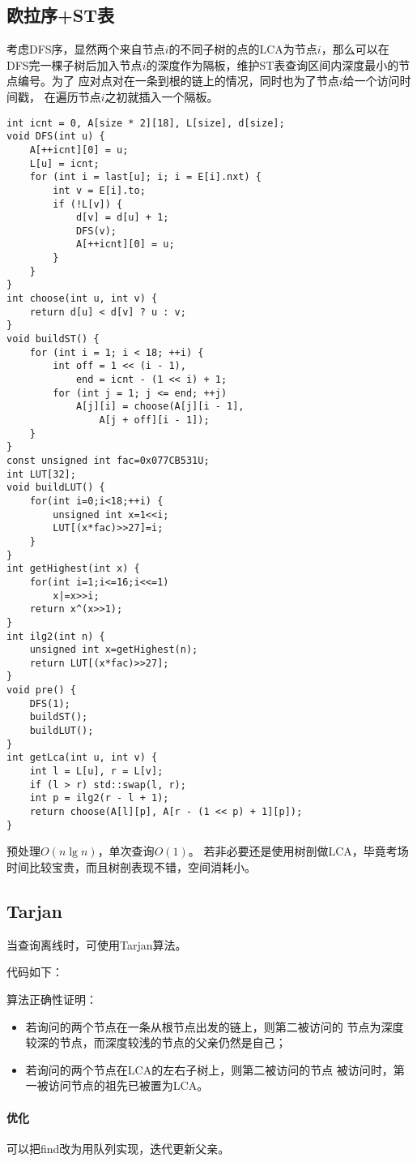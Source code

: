 \subsection{欧拉序+ST表}
考虑DFS序，显然两个来自节点$i$的不同子树的点的LCA为节点$i$，那么可以在
DFS完一棵子树后加入节点$i$的深度作为隔板，维护ST表查询区间内深度最小的节点编号。为了
应对点对在一条到根的链上的情况，同时也为了节点$i$给一个访问时间戳，
在遍历节点$i$之初就插入一个隔板。
\begin{lstlisting}
int icnt = 0, A[size * 2][18], L[size], d[size];
void DFS(int u) {
    A[++icnt][0] = u;
    L[u] = icnt;
    for (int i = last[u]; i; i = E[i].nxt) {
        int v = E[i].to;
        if (!L[v]) {
            d[v] = d[u] + 1;
            DFS(v);
            A[++icnt][0] = u;
        }
    }
}
int choose(int u, int v) {
    return d[u] < d[v] ? u : v;
}
void buildST() {
    for (int i = 1; i < 18; ++i) {
        int off = 1 << (i - 1),
            end = icnt - (1 << i) + 1;
        for (int j = 1; j <= end; ++j)
            A[j][i] = choose(A[j][i - 1],
                A[j + off][i - 1]);
    }
}
const unsigned int fac=0x077CB531U;
int LUT[32];
void buildLUT() {
    for(int i=0;i<18;++i) {
        unsigned int x=1<<i;
        LUT[(x*fac)>>27]=i;
    }
}
int getHighest(int x) {
    for(int i=1;i<=16;i<<=1)
        x|=x>>i;
    return x^(x>>1);
}
int ilg2(int n) {
    unsigned int x=getHighest(n);
    return LUT[(x*fac)>>27];
}
void pre() {
    DFS(1);
    buildST();
    buildLUT();
}
int getLca(int u, int v) {
    int l = L[u], r = L[v];
    if (l > r) std::swap(l, r);
    int p = ilg2(r - l + 1);
    return choose(A[l][p], A[r - (1 << p) + 1][p]);
}
\end{lstlisting}

预处理$O(n\lg n)$，单次查询$O(1)$。
若非必要还是使用树剖做LCA，毕竟考场时间比较宝贵，而且树剖表现不错，空间消耗小。
\subsection{Tarjan}
当查询离线时，可使用Tarjan算法。

代码如下：


算法正确性证明：
\begin{itemize}
    \item 若询问的两个节点在一条从根节点出发的链上，则第二被访问的
    节点为深度较深的节点，而深度较浅的节点的父亲仍然是自己；
    \item 若询问的两个节点在LCA的左右子树上，则第二被访问的节点
    被访问时，第一被访问节点的祖先已被置为LCA。
\end{itemize}

\paragraph{优化} 可以把find改为用队列实现，迭代更新父亲。
